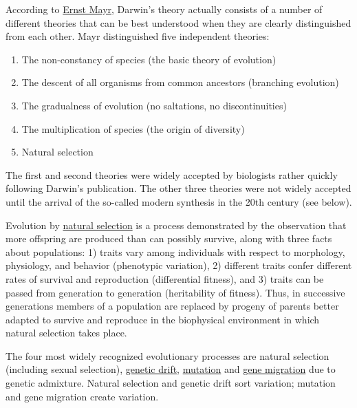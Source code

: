 According to \href{https://en.wikipedia.org/wiki/Ernst_Mayr}{Ernst Mayr}, Darwin's theory actually consists of a number of different theories that can be best understood when they are clearly distinguished from each other. Mayr distinguished five independent theories:

\begin{enumerate}
\def\labelenumi{\arabic{enumi}.}
\tightlist
\item
  The non-constancy of species (the basic theory of evolution)
\item
  The descent of all organisms from common ancestors (branching evolution)
\item
  The gradualness of evolution (no saltations, no discontinuities)
\item
  The multiplication of species (the origin of diversity)
\item
  Natural selection
\end{enumerate}

The first and second theories were widely accepted by biologists rather quickly following Darwin's publication. The other three theories were not widely accepted until the arrival of the so-called modern synthesis in the 20th century (see below).

Evolution by \href{https://en.wikipedia.org/wiki/Natural_selection}{natural selection} is a process demonstrated by the observation that more offspring are produced than can possibly survive, along with three facts about populations: 1) traits vary among individuals with respect to morphology, physiology, and behavior (phenotypic variation), 2) different traits confer different rates of survival and reproduction (differential fitness), and 3) traits can be passed from generation to generation (heritability of fitness). Thus, in successive generations members of a population are replaced by progeny of parents better adapted to survive and reproduce in the biophysical environment in which natural selection takes place.

The four most widely recognized evolutionary processes are natural selection (including sexual selection), \href{https://en.wikipedia.org/wiki/Genetic_drift}{genetic drift}, \href{https://en.wikipedia.org/wiki/Mutation}{mutation} and \href{https://en.wikipedia.org/wiki/Gene_flow}{gene migration} due to genetic admixture. Natural selection and genetic drift sort variation; mutation and gene migration create variation.

